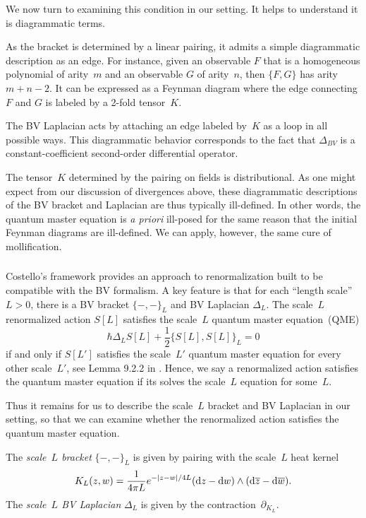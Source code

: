 We now turn to examining this condition in our setting.
It helps to understand it is diagrammatic terms.

As the bracket is determined by a linear pairing,
it admits a simple diagrammatic description as an edge.
For instance, given an observable $F$ that is a homogeneous polynomial of arity~$m$
and an observable $G$ of arity~$n$, 
then $\{F,G\}$ has arity~$m+n-2$.
It can be expressed as a Feynman diagram 
where the edge connecting $F$ and $G$ is labeled by a 2-fold tensor~$K$.

The BV Laplacian acts by attaching an edge labeled by~$K$ as a loop in all possible ways.
This diagrammatic behavior corresponds to the fact that $\Delta_{BV}$ is a constant-coefficient second-order differential operator.

The tensor~$K$ determined by the pairing on fields is distributional.
As one might expect from our discussion of divergences above,
these diagrammatic descriptions of the BV bracket and Laplacian are thus typically ill-defined.
In other words, the quantum master equation is {\em a priori} ill-posed for the same reason that the initial Feynman diagrams are ill-defined.
We can apply, however, the same cure of mollification.

\subsubsection{}

Costello's framework \cite{CosBook} provides an approach to renormalization built to be compatible with the BV formalism.
A key feature is that for each ``length scale''~$L>0$, 
there is a BV bracket $\{-,-\}_L$ and BV Laplacian $\Delta_L$.
The scale~$L$ renormalized action $S[L]$ satisfies the scale~$L$ quantum master equation~(QME)
\[
\hbar \Delta_{L} S[L] + \frac{1}{2}\{S[L],S[L]\}_L = 0
\]
if and only if $S[L']$ satisfies the scale~$L'$ quantum master equation for every other scale~$L'$, see Lemma 9.2.2 in \cite{cosbook}.
Hence, we say a renormalized action satisfies the quantum master equation if its solves the scale~$L$ equation for some~$L$.

Thus it remains for us to describe the scale~$L$ bracket and BV Laplacian in our setting,
so that we can examine whether the renormalized action satisfies the quantum master equation.

\begin{dfn}
The {\em scale~$L$ bracket} $\{-,-\}_L$ is given by pairing with the scale~$L$ heat kernel
\[
K_L(z,w) = \frac{1}{4\pi L} e^{-|z-w|/4L} ({\rm d} z - {\rm d} w) \wedge ({\rm d}\overline{z} - {\rm d}\overline{w}). 
\]
The {\em scale~$L$ BV Laplacian} $\Delta_L$ is given by the contraction~$\partial_{K_L}$.
\end{dfn}

